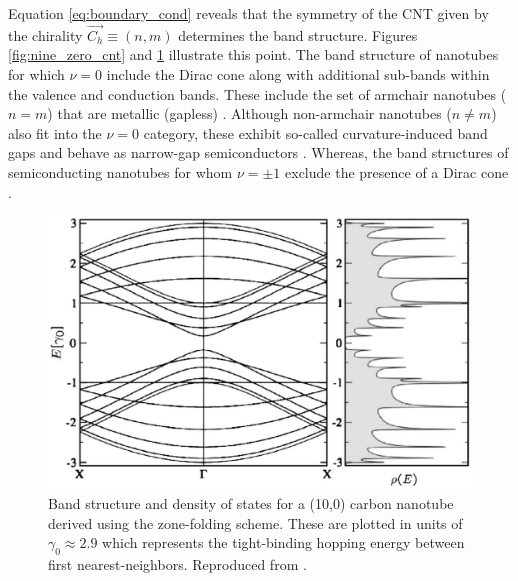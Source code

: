Equation \ref{eq:boundary_cond} reveals that the symmetry of the CNT given by the chirality $\vec{C_h} \equiv (n,m)$ determines the band structure. Figures \ref{fig:nine_zero_cnt} and \ref{fig:ten_zero_cnt} illustrate this point. The band structure of nanotubes for which $\nu = 0$ include the Dirac cone along with additional sub-bands within the valence and conduction bands. These include the set of armchair nanotubes ($n=m$) that are metallic (gapless) \cite{nanot2012optoelectronic}. Although non-armchair nanotubes ($n\neq m$) also fit into the $\nu = 0$ category, these exhibit so-called curvature-induced band gaps and behave as narrow-gap semiconductors \cite{nanot2012optoelectronic}.  Whereas, the band structures of semiconducting nanotubes for whom $\nu = \pm 1$ exclude the presence of a Dirac cone \cite{charlier2007electronic}.
 


\begin{figure}[h]
	\centering
	\includegraphics[scale=0.38]{images/chapter_optical_props/ten_zero_band_charlier}
	\caption{Band structure and density of states for a (10,0) carbon nanotube derived using the zone-folding scheme. These are plotted in units of $\gamma_0 \approx 2.9$ which represents the tight-binding hopping energy between first nearest-neighbors. Reproduced from \cite{charlier2007electronic}.}
	\label{fig:ten_zero_cnt}
\end{figure}


